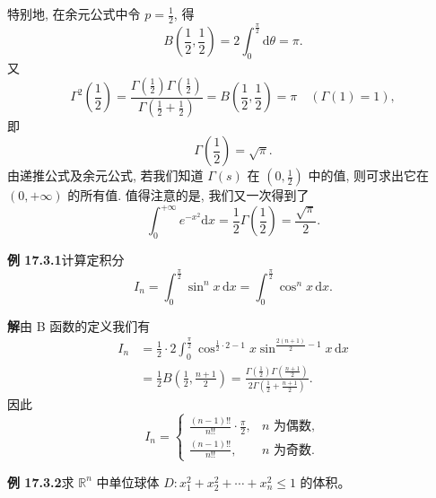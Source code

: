 \documentclass[UTF8,12pt,a4paper,fontset=fandol]{ctexart}
\begin{document}
特别地, 在余元公式中令 $p=\frac12$, 得
\[
  B\left(\frac12,\frac12\right)=2\int_0^{\frac\pi2}\mathrm d\theta=\pi.
\]
又
\[
  \Gamma^2\left(\frac12\right)
  =\frac{\Gamma\left(\frac12\right)\Gamma\left(\frac12\right)}
  {\Gamma\left(\frac12+\frac12\right)}
  =B\left(\frac12,\frac12\right)=\pi\quad(\Gamma(1)=1),
\]
即
\[
  \Gamma\left(\frac12\right)=\sqrt\pi.
\]
由递推公式及余元公式, 若我们知道 $\Gamma(s)$ 在 $\left(0,\frac12\right)$ 中的值, 则可求出它在 $(0,+\infty)$ 的所有值. 值得注意的是, 我们又一次得到了
\[
  \int_0^{+\infty}e^{-x^2}\mathrm dx=\frac12\Gamma\left(\frac12\right)=\frac{\sqrt\pi}{2}.
\]

\noindent\textbf{例 17.3.1}\quad 计算定积分
\[
  I_n=\int_0^{\frac\pi2}\sin^n x\,\mathrm dx
  =\int_0^{\frac\pi2}\cos^n x\,\mathrm dx.
\]

\noindent\textbf{解}\quad 由 B 函数的定义我们有
\[
\begin{aligned}
  I_n
  &=\frac12\cdot2\int_0^{\frac\pi2}\cos^{\frac12\cdot2-1}x
    \sin^{\frac{2(n+1)}2-1}x\,\mathrm dx\\
  &=\frac12 B\left(\frac12,\frac{n+1}{2}\right)
  =\frac{\Gamma\left(\frac12\right)\Gamma\left(\frac{n+1}{2}\right)}
  {2\Gamma\left(\frac12+\frac{n+1}{2}\right)}.
\end{aligned}
\]
因此
\[
I_n=
\begin{cases}
  \displaystyle \frac{(n-1)!!}{n!!}\cdot\frac\pi2, & n\text{ 为偶数},\\[1.2ex]
  \displaystyle \frac{(n-1)!!}{n!!}, & n\text{ 为奇数}.
\end{cases}
\]

\noindent\textbf{例 17.3.2}\quad 求 $\mathbb R^n$ 中单位球体 $D:x_1^2+x_2^2+\cdots+x_n^2\leqslant1$ 的体积。
\end{document}
